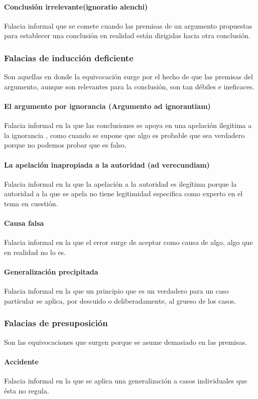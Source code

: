 \documentclass[10pt]{book} 						%
\begin{document}
\paragraph{Conclusión irrelevante(ignoratio alenchi)}
Falacia informal que se comete cuando las premisas de un argumento propuestas para  establecer una conclusión en realidad están dirigidas hacia otra conclusión.
\subsubsection{Falacias de inducción deficiente}
Son aquellas en donde la equivocación surge por el hecho de que las premisas del argumento, aunque son relevantes para la conclusión, son tan débiles e ineficaces. 
\paragraph{El argumento por ignorancia (Argumento ad ignorantiam)}
Falacia informal en la que las conclusiones se apoya en una apelación ilegitima a la ignorancia , como cuando se supone que algo es probable que sea verdadero porque no podemos probar que es falso.
\paragraph{La apelación inapropiada a la autoridad (ad verecundiam)}
Falacia informal en la que la apelación a la autoridad es ilegítima porque la autoridad a la que se apela no tiene legitimidad especifica como experto en el tema en cuestión.
\paragraph{Causa falsa}
Falacia informal en la que el error surge de aceptar como causa de algo, algo que en realidad no lo es.
\paragraph{Generalización precipitada}
Falacia informal en la que un principio que es un verdadero para un caso particular se aplica, por descuido o deliberadamente, al grueso de los casos.

\subsubsection{Falacias de presuposición}
Son las equivocaciones que surgen porque se asume demasiado en las premisas.
\paragraph{Accidente}
Falacia informal en la que se aplica una generalización a casos individuales que ésta no regula.
\end{document}
